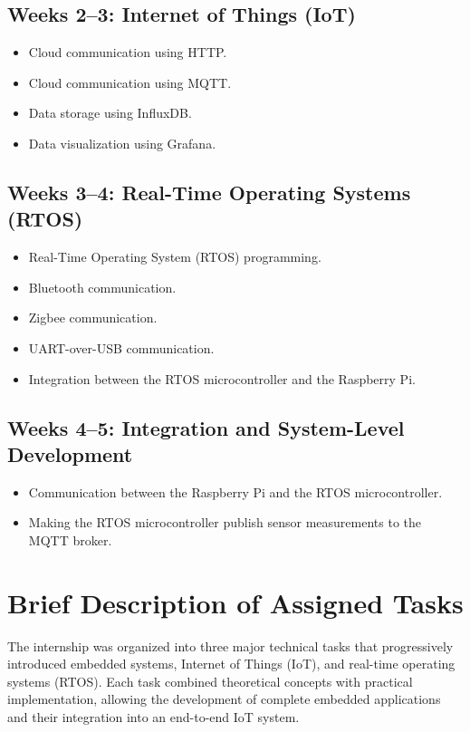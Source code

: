 \documentclass[conference]{IEEEtran}
\begin{document}
\subsection*{Weeks 2--3: Internet of Things (IoT)}
\begin{itemize}
    \item Cloud communication using HTTP.
    \item Cloud communication using MQTT.
    \item Data storage using InfluxDB.
    \item Data visualization using Grafana.
\end{itemize}

\subsection*{Weeks 3--4: Real-Time Operating Systems (RTOS)}
\begin{itemize}
    \item Real-Time Operating System (RTOS) programming.
    \item Bluetooth communication.
    \item Zigbee communication.
    \item UART-over-USB communication.
    \item Integration between the RTOS microcontroller and the Raspberry Pi.
\end{itemize}

\subsection*{Weeks 4--5: Integration and System-Level Development}
\begin{itemize}
    \item Communication between the Raspberry Pi and the RTOS microcontroller.
    \item Making the RTOS microcontroller publish sensor measurements to the MQTT broker.
\end{itemize}


\section{Brief Description of Assigned Tasks}

The internship was organized into three major technical tasks that progressively introduced embedded systems, Internet of Things (IoT), and real-time operating systems (RTOS). Each task combined theoretical concepts with practical implementation, allowing the development of complete embedded applications and their integration into an end-to-end IoT system. \cite{repo}
\end{document}
